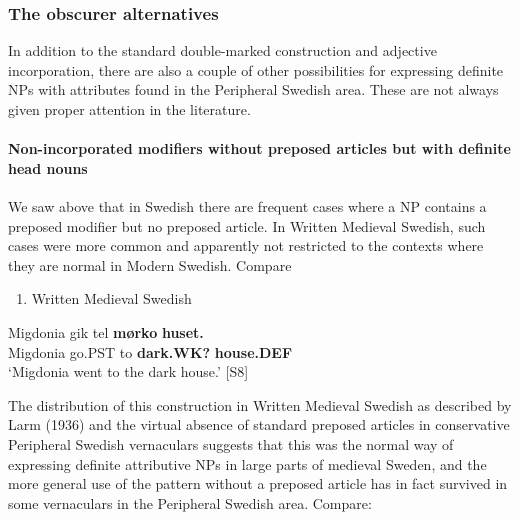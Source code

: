 \subsubsection[The obscurer alternatives]{\rmfamily The obscurer alternatives}
\label{bkm:Ref105224927}%
In addition to the standard double-marked construction and adjective incorporation, there are also a couple of other possibilities for expressing definite NPs with attributes found in the Peripheral Swedish area. These are not always given proper attention in the literature. 

\paragraph[Non{}-incorporated modifiers without preposed articles but with definite head nouns]{\rmfamily Non-incorporated modifiers without preposed articles but with definite head nouns}
\label{bkm:Ref154984033}%
We saw above that in Swedish there are frequent cases where a NP contains a preposed modifier but no preposed article. In Written Medieval Swedish, such cases were more common and apparently not restricted to the contexts where they are normal in Modern Swedish. Compare 

\begin{enumerate} %
\item 
Written Medieval Swedish

\end{enumerate} %
\ea\label{}
\gll Migdonia  gik  tel  \textbf{mørko} \textbf{huset.}\\


Migdonia  go.PST  to  \textbf{dark.WK?} \textbf{house.DEF}\\ %


‘Migdonia went to the dark house.’ [S8]
\z

The distribution of this construction in Written Medieval Swedish as described by Larm (1936) and the virtual absence of standard preposed articles in conservative Peripheral Swedish vernaculars suggests that this was the normal way of expressing definite attributive NPs in large parts of medieval Sweden, and the more general use of the pattern without a preposed article has in fact survived in some vernaculars in the Peripheral Swedish area. Compare: 

